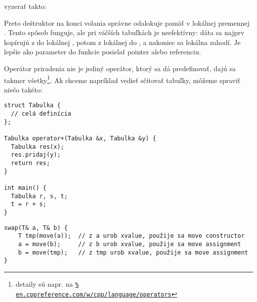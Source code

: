 vyzerať takto:



Preto deštruktor na konci volania správne odalokuje pamäť v lokálnej premennej .
Tento spôsob funguje, ale pri väčších tabuľkách je neefektívny: dáta sa najprv kopírujú
z  do lokálnej , potom z lokálnej  do , a nakoniec
sa lokálna  zahodí. Je lepšie ako parameter do funkcie posielať pointer alebo referenciu.

 Operátor priradenia nie je jediný operátor, ktorý sa dá predefinovať, dajú sa takmer
všetky\footnote{%
  detaily sú napr. na 
  \href{https://en.cppreference.com/w/cpp/language/operators}{\nolinkurl{%
en.cppreference.com/w/cpp/language/operators}}}.
Ak chceme napríklad vedieť sčitovať tabuľky, môžeme spraviť niečo takéto:

\begin{lstlisting}
struct Tabulka {
  // celá definícia
};

Tabulka operator+(Tabulka &x, Tabulka &y) {
  Tabulka res(x);
  res.pridaj(y);
  return res;
}

int main() {
  Tabulka r, s, t;
  t = r + s;
}
\end{lstlisting}

\begin{lrbox}{\TmpBox}
  \begin{lstlisting}[basicstyle=\scriptsize\roboto]
swap(T& a, T& b) {
    T tmp(move(a));  // z a urob xvalue, použije sa move constructor
    a = move(b);     // z b urob xvalue, použije sa move assignment
    b = move(tmp);   // z tmp urob xvalue, použije sa move assignment
}
\end{lstlisting}
\end{lrbox}

